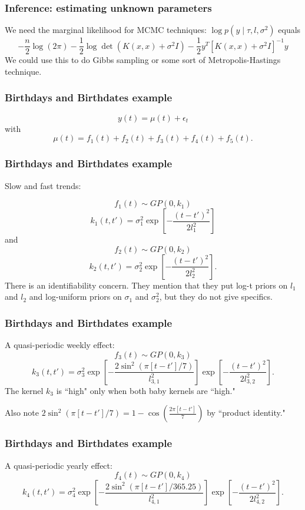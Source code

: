 \documentclass{beamer}
\begin{document}
\begin{frame}
\frametitle{Inference: estimating unknown parameters}

We need the marginal likelihood for MCMC techniques: $\log p(y \mid \tau, l, \sigma^2)$ equals
$$
-\frac{n}{2}\log(2\pi) - \frac{1}{2}\log \det(K(x,x) + \sigma^2I) - \frac{1}{2} y^T [K(x,x) + \sigma^2I]^{-1} y
$$
We could use this to do Gibbs sampling or some sort of Metropolis-Hastings technique.
\newline

\end{frame}

\begin{frame}
\frametitle{Birthdays and Birthdates example}

$$
y(t) = \mu(t) + \epsilon_t
$$
with
$$
\mu(t) = f_1(t) + f_2(t) + f_3(t) + f_4(t) + f_5(t).
$$

\end{frame}

\begin{frame}
\frametitle{Birthdays and Birthdates example}

Slow and fast trends:

$$
f_1(t) \sim GP(0, k_1)
$$
$$
k_1(t,t') = \sigma_1^2 \exp\left[-\frac{(t-t')^2}{ 2l_1^2 } \right]
$$
and
$$
f_2(t) \sim GP(0, k_2)
$$
$$
k_2(t,t') = \sigma_2^2 \exp\left[-\frac{(t-t')^2}{ 2 l_2^2 } \right].
$$
There is an identifiability concern. They mention that they put log-t priors on $l_1$ and $l_2$ and log-uniform priors on $\sigma_1$ and $\sigma_2^2$, but they do not give specifics.

\end{frame}

\begin{frame}
\frametitle{Birthdays and Birthdates example}

A quasi-periodic weekly effect:
$$
f_3(t) \sim GP(0, k_3)
$$
$$
k_3(t,t') = \sigma_3^2 \exp\left[-\frac{2\sin^2 (\pi[t-t']/7)}{ l_{3,1}^2 } \right]\exp\left[-\frac{(t-t')^2}{ 2 l_{3,2}^2 } \right].
$$
The kernel $k_3$ is ``high" only when both baby kernels are ``high."
\newline

Also note $2\sin^2 (\pi[t-t']/7) = 1 - \cos\left( \frac{2\pi [t-t']}{7} \right)$ by ``product identity."

\end{frame}
\begin{frame}
\frametitle{Birthdays and Birthdates example}

A quasi-periodic yearly effect:
$$
f_4(t) \sim GP(0, k_4)
$$
$$
k_4(t,t') = \sigma_4^2 \exp\left[-\frac{2\sin^2 (\pi[t-t']/365.25)}{ l_{4,1}^2 } \right]\exp\left[-\frac{(t-t')^2}{ 2 l_{4,2}^2 } \right].
$$

\end{frame}
\end{document}
